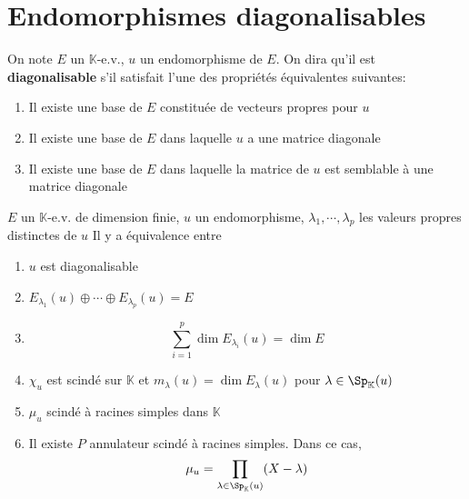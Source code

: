 \section{Endomorphismes diagonalisables}

\begin{defprop}
    On note $E$ un $\mathbb K$-e.v., $u$ un endomorphisme de $E$. On dira qu'il est \textbf{diagonalisable} s'il satisfait l'une des propriétés équivalentes suivantes: \begin{enumerate}
        \item Il existe une base de $E$ constituée de vecteurs propres pour $u$
        \item Il existe une base de $E$ dans laquelle $u$ a une matrice diagonale
        \item Il existe une base de $E$ dans laquelle la matrice de $u$ est semblable à une matrice diagonale
    \end{enumerate}
\end{defprop}

\begin{thm}
    \Hyp $E$ un $\mathbb K$-e.v. de dimension finie, $u$ un endomorphisme, $\lambda_1, \cdots, \lambda_p$ les valeurs propres distinctes de $u$
    \Conc Il y a équivalence entre \begin{enumerate}[leftmargin=2cm,label=(\alph{enumi})]
        \item $u$ est diagonalisable
        \item $E_{\lambda_1}(u)\oplus \cdots \oplus E_{\lambda_p}(u)=E$
        \item \[
                \sum_{i=1}^p\dim E_{\lambda_i}(u)=\dim E
            \]
        \item $\chi_u$ est scindé sur $\mathbb K$ et $m_{\lambda}(u)=\dim E_{\lambda}(u)$ pour $\lambda\in\Sp_{\mathbb K}(u)$
        \item $\mu_u$ scindé à racines simples dans $\mathbb K$
        \item Il existe $P$ annulateur scindé à racines simples. Dans ce cas, \[
                \mu_u=\prod_{\lambda\in\Sp_{\mathbb K}(u)}(X-\lambda)
            \]
    \end{enumerate}
\end{thm}


